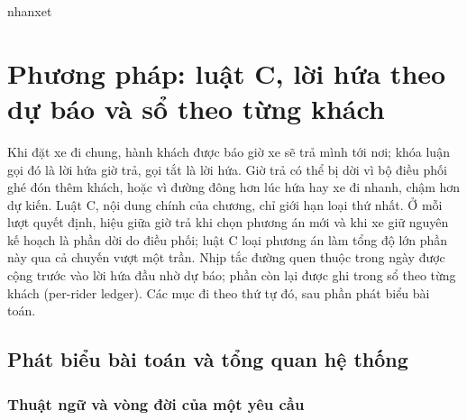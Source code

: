 
\ifcsname nhanxet\endcsname\else
  \theoremstyle{definition}
  \newtheorem{nhanxet}{Nhận xét}[chapter]
\fi

\chapter{Phương pháp: luật C, lời hứa theo dự báo và sổ theo từng khách}
\label{chuong:phuongphap}

Khi đặt xe đi chung, hành khách được báo giờ xe sẽ trả mình tới nơi; khóa luận gọi đó là lời hứa giờ trả, gọi
tắt là lời hứa. Giờ trả có thể bị dời vì bộ điều phối ghé đón thêm khách, hoặc vì đường đông hơn lúc hứa hay xe
đi nhanh, chậm hơn dự kiến. Luật C, nội dung chính của chương, chỉ giới hạn loại thứ nhất. Ở mỗi lượt quyết định,
hiệu giữa giờ trả khi
chọn phương án mới và khi xe giữ nguyên kế hoạch là phần dời do điều phối; luật C loại phương án làm tổng độ lớn
phần này qua cả chuyến vượt một trần. Nhịp tắc đường quen thuộc trong ngày được cộng trước vào lời hứa đầu nhờ dự
báo; phần còn lại được ghi trong sổ theo từng khách (per-rider ledger). Các mục đi theo thứ tự đó, sau phần phát
biểu bài toán.

\section{Phát biểu bài toán và tổng quan hệ thống}
\label{muc:baitoan}

\subsection{Thuật ngữ và vòng đời của một yêu cầu}
\label{muc:thuatngu}

